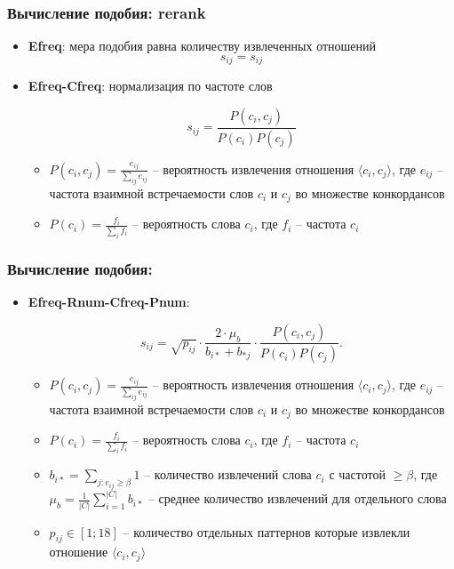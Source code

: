 \begin{frame}
\frametitle{Вычисление подобия: rerank}


\begin{itemize}
  \item \textbf{Efreq}: мера подобия равна количеству извлеченных отношений
  $$ s_{ij} = s_{ij} $$
  
  \item \textbf{Efreq-Cfreq}: нормализация по частоте слов
  
  $$ s_{ij} = \frac{P(c_i,c_j)}{P(c_i)P(c_j)} $$ 
    
    \begin{itemize}
    \item $P(c_i,c_j)=\frac{e_{ij}}{\sum_{ij}e_{ij}}$ -- вероятность извлечения
отношения $\langle c_i,c_j \rangle$, где $e_{ij}$ -- частота
взаимной встречаемости слов $c_i$ и $c_j$ во множестве конкордансов

\item $P(c_i)= \frac{f_i}{\sum_i f_i}$ -- вероятность слова $c_i$, где $f_i$
-- частота $c_i$

\end{itemize}
    
\end{itemize}

\end{frame}


\begin{frame}
\frametitle{Вычисление подобия: }
  
\begin{itemize}
  
\item \textbf{Efreq-Rnum-Cfreq-Pnum}:
  
$$s_{ij} = \sqrt{p_{ij}} \cdot \frac{2\cdot\mu_b }{b_{i*}+b_{*j}} \cdot \frac{P(c_i,c_j)}{P(c_i)P(c_j)}.$$

\begin{itemize}

\item $P(c_i,c_j)=\frac{e_{ij}}{\sum_{ij}e_{ij}}$ -- вероятность извлечения
отношения $\langle c_i,c_j \rangle$, где $e_{ij}$ -- частота
взаимной встречаемости слов $c_i$ и $c_j$ во множестве конкордансов

\item $P(c_i)= \frac{f_i}{\sum_i f_i}$ -- вероятность слова $c_i$, где $f_i$
-- частота $c_i$
\item $b_{i*} = \sum_{j:e_{ij} \geq \beta} 1$ -- количество извлечений слова
$c_i$ с частотой $\geq \beta$,  где $\mu_b = \frac{1}{|C|}\sum_{i=1}^{|C|}
b_{i*}$ -- среднее количество извлечений для отдельного слова

\item $p_{ij} \in [1;18]$ -- количество отдельных паттернов которые извлекли
отношение $\langle c_i, c_j \rangle$
 
\end{itemize}
\end{itemize}

\end{frame}






